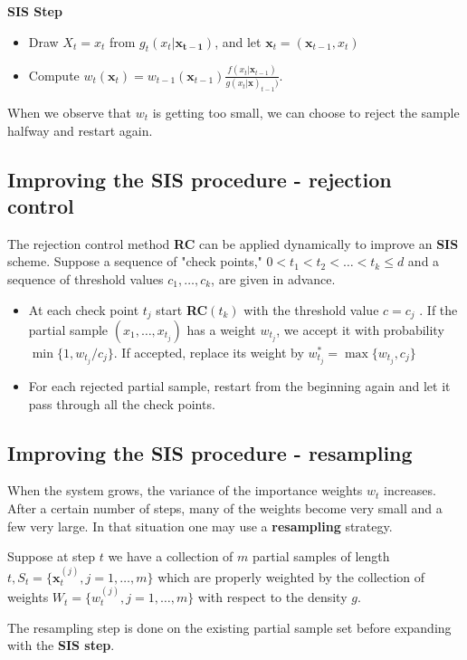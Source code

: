 \documentclass[times, utf8, diplomski]{fer}
\begin{document}
\textbf{SIS Step}
\label{SIS_step}
\begin{itemize}
\item{Draw $X_t=x_t$ from $g_t(x_t | \mathbf{x_{t-1}})$, and let $\mathbf{x}_t = (\mathbf{x}_{t - 1}, x_t)$}
\item{
Compute $w_t(\mathbf{x}_t) = w_{t - 1}(\mathbf{x}_{t - 1})\frac{f(x_t | \mathbf{x}_{t - 1})}{g(x_t | \mathbf{x})_{t - 1})}$.
}
\end{itemize}

When we observe that $w_t$ is getting too small, we can choose to reject the sample halfway and restart again.


\subsection{Improving the SIS procedure - rejection control}
\label{SIS_RC}
The rejection control method \textbf{RC} can be applied dynamically to improve an \textbf{SIS} scheme. Suppose a sequence of "check points," $0 < t_1 < t_2 < \ldots < t_k \leq d$ and a sequence of threshold values $c_1, \ldots, c_k$, are given in advance. 
\begin{itemize}
\item{At each check point $t_j$ start \textbf{RC}$(t_k)$ with the threshold value $c = c_j$ . If the partial sample $(x_1, \ldots, x_{t_j})$ has a weight $w_{t_j}$, we accept it with probability $\min \{ 1, w_{t_j}/c_j \}$. If accepted, replace its weight by $w^{*}_{t_j} = \max \{ w_{t_j}, c_j \}$}
\item{For each rejected partial sample, restart from the beginning again and let it pass through all the check points.}
\end{itemize}

\subsection{Improving the SIS procedure - resampling}
When the system grows, the variance of the importance weights $w_t$ increases. After a certain number of steps, many of the weights become very small and a few very large. In that situation one may use a \textbf{resampling} strategy. 

Suppose at step $t$ we have a collection of $m$ partial samples of length $t, S_t = \{ \mathbf{x}_{t}^{(j)}, j = 1, \ldots, m \}$ which are properly weighted by the collection of weights $W_t = \{w_t^{(j)}, j = 1, \ldots, m\}$ with respect to the density $g$.

The resampling step is done on the existing partial sample set before expanding with the \textbf{SIS step}.
\end{document}

